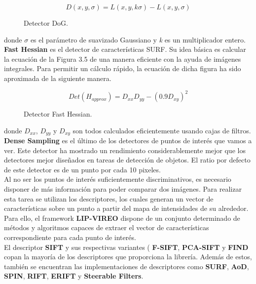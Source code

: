\begin{figure}[htbp]
\centering
\[
D(x, y, \sigma) = L(x,y,k\sigma) - L(x,y,\sigma)
\]
\caption{Detector DoG.} 
\end{figure} 

donde $\sigma$ es el parámetro de suavizado Gaussiano y \textit{k} es un multiplicador entero. \\ 

\textbf{Fast Hessian} es el detector de características SURF. Su idea básica es calcular la ecuación de la Figura 3.5 de una manera eficiente con la ayuda de imágenes integrales. Para permitir un cálculo rápido, la ecuación de dicha figura ha sido aproximada de la siguiente manera. 

\begin{figure}[htbp]
\centering
\[
Det(H_{approx}) = D_{xx}D_{yy} - (0.9D_{xy})^2
\]
\caption{Detector Fast Hessian.} 
\end{figure}

donde $D_{xx}$, $D_{yy}$ y $D_{xy}$ son todos calculados eficientemente usando cajas de filtros. \\

\textbf{Dense Sampling} es el último de los detectores de puntos de interés que vamos a ver. Este detector ha mostrado un rendimiento considerablemente mejor que los detectores mejor diseñados en tareas de detección de objetos. El ratio por defecto de este detector es de un punto por cada 10 pixeles. \\

Al no ser los puntos de interés suficientemente discriminativos, es necesario disponer de más información para poder comparar dos imágenes. Para realizar esta tarea se utilizan los descriptores, los cuales generan un vector de características sobre un punto a partir del mapa de intensidades de su alrededor. Para ello, el framework \textbf{LIP-VIREO} dispone de un conjunto determinado de métodos y algoritmos capaces de extraer el vector de características correspondiente para cada punto de interés.  \\

El descriptor \textbf{SIFT} y sus respectivas variantes ( \textbf{F-SIFT}, \textbf{PCA-SIFT} y \textbf{FIND} copan la mayoría de los descriptores que proporciona la librería. Además de estos, también se encuentran las implementaciones de descriptores como \textbf{SURF}, \textbf{AoD}, \textbf{SPIN}, \textbf{RIFT}, \textbf{ERIFT} y \textbf{Steerable Filters}. \\

